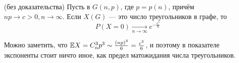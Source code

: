 \begin{theorem} (без доказательства)
	Пусть в $G(n, p)$, где $p = p(n)$, причём $np \to c > 0, n \to \infty$. Если $X(G)$ --- это число треугольников в графе, то
	\[
		P(X = 0) \xrightarrow[n \to \infty]{} e^{-\frac{c^3}6}
	\]
\end{theorem}

\begin{note}
	Можно заметить, что $\mathbb{E} X = C_n^3 p^3 \sim \frac{(np)^3}{6} = \frac{c^3}{6}$, и поэтому в показателе экспоненты стоит ничто иное, как предел матожидания числа треугольников.
\end{note}